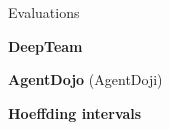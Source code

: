 \documentclass[aspectratio=169, 11pt]{beamer}
\begin{document}
\begin{frame}{Evaluations}
    \begin{plaincard}[AccentBlue]
        \textbf{DeepTeam}
    \end{plaincard}
    \vspace{0.2cm}
    \begin{plaincard}[AccentIndigo]
        \textbf{AgentDojo} (AgentDoji)
    \end{plaincard}
    \vspace{0.2cm}
    \begin{plaincard}[AccentTeal]
        \textbf{Hoeffding intervals}
    \end{plaincard}
\end{frame}
\end{document}
